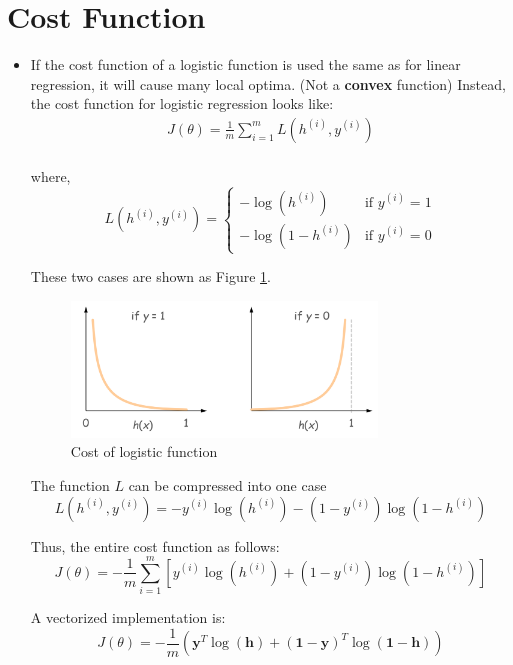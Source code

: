 \section{Cost Function}
\begin{itemize}
    \item If the cost function of a logistic function is used the same as for linear regression, it will cause many local optima. (Not a \textbf{convex} function)
    Instead, the cost function for logistic regression looks like:
    \begin{equation}
        \begin{split}
            J(\theta) = \frac{1}{m}\sum_{i=1}^{m}{L(h^{(i)},y^{(i)})}\\
        \end{split}
    \end{equation}
    
    where,
    \begin{equation}
        L(h^{(i)},y^{(i)}) =
        \left\{
        \begin{array}{ll}
            -\log{(h^{(i)})}   & \mbox{if $y^{(i)}=1$}\\
            -\log{(1-h^{(i)})} & \mbox{if $y^{(i)}=0$}
        \end{array}
        \right.
    \end{equation}
    
    These two cases are shown as Figure \ref{fig:logisticCostttt}. 
    \begin{figure}[!htbp]\label{fig:logisticCostttt}
        \centering
        \includegraphics[width=3.2in]{./images/logisticCost.png}
        \caption{Cost of logistic function}
    \end{figure}

    The function $L$ can be compressed into one case
    \begin{equation}
        L(h^{(i)},y^{(i)}) = -y^{(i)}\log{(h^{(i)})}-(1-y^{(i)})\log{(1-h^{(i)})}
    \end{equation}
    
    Thus, the entire cost function as follows:
    \begin{equation}
        J(\theta) = -\frac{1}{m} \sum_{i=1}^{m} \left[ {y^{(i)}\log{(h^{(i)})}+(1-y^{(i)})\log{(1-h^{(i)})}} \right]
    \end{equation}
    
    A vectorized implementation is:
    \begin{equation}
        J(\theta) = -\frac{1}{m} \left( \mathbf{y}^T\log{(\mathbf{h})} + \mathbf{(1-y)}^T\log{(\mathbf{1-h})} \right)
    \end{equation}
\end{itemize}


